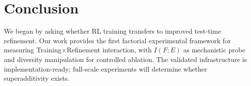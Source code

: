 \section{Conclusion}

We began by asking whether RL training transfers to improved test-time refinement. Our work provides the first factorial experimental framework for measuring Training$\times$Refinement interaction, with $I(F;E)$ as mechanistic probe and diversity manipulation for controlled ablation. The validated infrastructure is implementation-ready; full-scale experiments will determine whether superadditivity exists.
